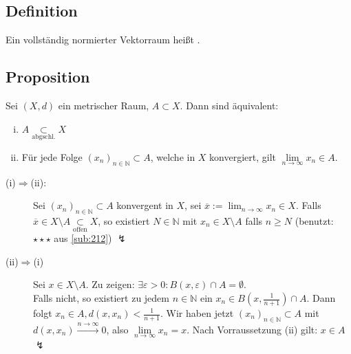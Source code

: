 \subsection[Definition Banachraum]{Definition} %
\label{sub:216}
Ein vollständig normierter Vektorraum heißt . 

\subsection[Proposition über abgeschlossene Teilmengen]{Proposition} %
\label{sub:217}
Sei $(X,d)$ ein metrischer Raum, $A \subset X$. Dann sind äquivalent:
\begin{enumerate}[(i)]
	\item $A \underset{\text{abgschl.}}{\subset} X$ 
	\item Für jede Folge $(x_n)_{n \in \mathds{N}} \subset A$, welche in $X$ konvergiert, gilt $\lim\limits_{ n \to \infty} x_n \in A$.
\end{enumerate}
\begin{description}
	\item[(i)$\Rightarrow$(ii):] Sei $(x_n)_{n \in \mathds{N}} \subset A$ konvergent in $X$, sei $ \overline{x} :=  \lim_{ n \to \infty} x_n  \in X$. Falls 
	$\overline{x} \in X \setminus A \underset{\text{offen}}{\subset} X$, so existiert $N \in \mathds{N}$ mit $x_n \in X \setminus A$ falls $n \ge N$ 
	(benutzt: $\star \star\star$ aus \ref{sub:212}) {\large $\lightning$}
	\item[(ii)$\Rightarrow$(i)] Sei $x \in X \setminus A$. Zu zeigen: $\exists \varepsilon >0 : B(x,\varepsilon) \cap A = \emptyset$. \\
	Falls nicht, so existiert zu jedem $n \in \mathds{N}$ ein $x_n \in B(x, \frac{1}{n+1}) \cap A$. Dann folgt $x_n  \in A , d(x,x_n)< \frac{1}{n+1}$. Wir haben jetzt 
	$(x_n)_{n \in \mathds{N}} \subset A$ mit $d(x,x_n) \xrightarrow{n \to \infty} 0$, also $\lim\limits_{ n \to \infty} x_n = x$. Nach Vorraussetzung (ii) gilt:
	$x \in  A$ {\large $\lightning$} \bewende
\end{description}

